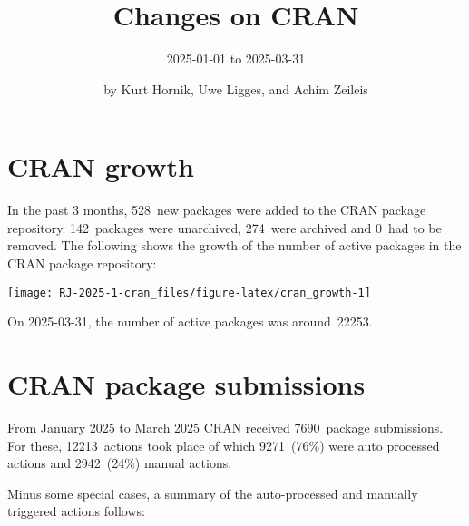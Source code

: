 \title{Changes on CRAN}

\subtitle{%
2025-01-01 to 2025-03-31
}

\author{by Kurt Hornik, Uwe Ligges, and Achim Zeileis}

\maketitle


\section{CRAN growth}\label{cran-growth}

In the past 3 months, 528~new packages were
added to the CRAN package repository. 142~packages
were unarchived, 274~were archived and
0~had to be removed. The following shows the
growth of the number of active packages in the CRAN package repository:

\begin{center}\texttt{[image: RJ-2025-1-cran\_files/figure-latex/cran\_growth-1]} \end{center}

\noindent On 2025-03-31, the number of active packages was around~22253.

\section{CRAN package submissions}\label{cran-package-submissions}

From January 2025 to March 2025
CRAN received 7690~package submissions.
For these, 12213~actions took place of which
9271~(76\%) were auto processed actions and
2942~(24\%) manual actions.

Minus some special cases, a summary of the auto-processed and manually
triggered actions follows:


